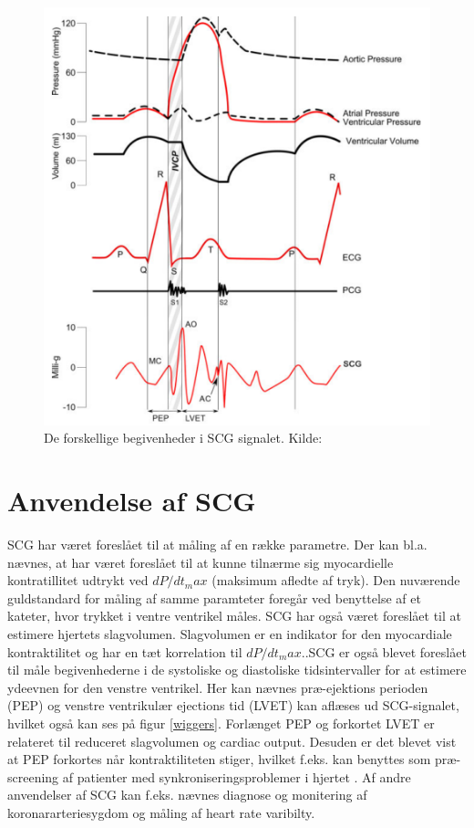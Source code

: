 \begin{figure}\label{fig:wigger}
\includegraphics[scale=1]{figures/wigger.PNG}
\caption{De forskellige begivenheder i SCG signalet. Kilde: \cite{zanetti}}
\end{figure}

\section{Anvendelse af SCG}
SCG har været foreslået til at måling af en række parametre. Der kan bl.a. nævnes, at har været foreslået til at kunne tilnærme sig myocardielle kontratillitet udtrykt ved $dP/dt_max$ (maksimum afledte af tryk). Den nuværende guldstandard for måling af samme paramteter foregår ved benyttelse af et kateter, hvor trykket i ventre ventrikel måles. SCG har også været foreslået til at estimere hjertets slagvolumen. Slagvolumen er en indikator for den myocardiale kontraktilitet og har en tæt korrelation til $dP/dt_max$..SCG er også blevet foreslået til måle begivenhederne i de systoliske og diastoliske tidsintervaller for at estimere ydeevnen for den venstre ventrikel. Her kan nævnes  præ-ejektions perioden (PEP) og venstre ventrikulær ejections tid (LVET) kan aflæses ud SCG-signalet, hvilket også kan ses på figur \ref{wiggers}. Forlænget PEP og forkortet LVET er relateret til reduceret slagvolumen og cardiac output. Desuden er det blevet vist at PEP forkortes når kontraktiliteten stiger, hvilket f.eks. kan benyttes som præ-screening af patienter med synkroniseringsproblemer i hjertet  \cite{Zanetti}  \cite{abra}. Af andre anvendelser af SCG kan f.eks. nævnes diagnose og monitering af koronararteriesygdom og måling af heart rate varibilty.

